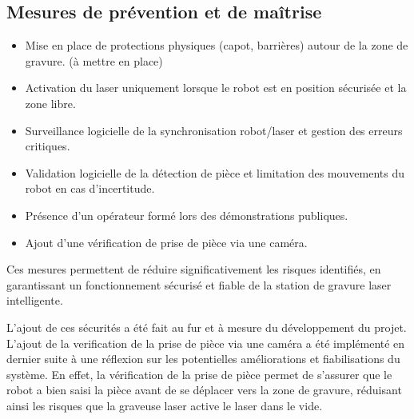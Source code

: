 \subsection{Mesures de prévention et de maîtrise}
\begin{itemize}
    \item Mise en place de protections physiques (capot, barrières) autour de la zone de gravure. (à mettre en place)
    \item Activation du laser uniquement lorsque le robot est en position sécurisée et la zone libre.
    \item Surveillance logicielle de la synchronisation robot/laser et gestion des erreurs critiques.
    \item Validation logicielle de la détection de pièce et limitation des mouvements du robot en cas d'incertitude.
    \item Présence d'un opérateur formé lors des démonstrations publiques.
    \item Ajout d'une vérification de prise de pièce via une caméra.
\end{itemize}

Ces mesures permettent de réduire significativement les risques identifiés, en garantissant un fonctionnement sécurisé et fiable de la station de gravure laser intelligente.

L'ajout de ces sécurités a été fait au fur et à mesure du développement du projet. L'ajout de la verification de la prise de pièce via une caméra a été implémenté en dernier suite à une réflexion sur les potentielles améliorations et fiabilisations du système. En effet, la vérification de la prise de pièce permet de s'assurer que le robot a bien saisi la pièce avant de se déplacer vers la zone de gravure, réduisant ainsi les risques que la graveuse laser active le laser dans le vide.
